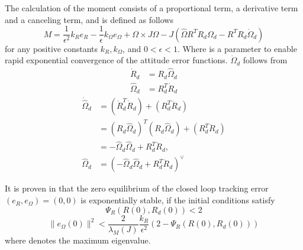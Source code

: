 
The calculation of the moment consists of a proportional term, a derivative term and a canceling term, and is defined as follows
\begin{equation}\label{eq:con.M}
M = \frac{1}{\epsilon^2}k_Re_R-\frac{1}{\epsilon}k_\Omega e_\Omega+\Omega\times J\Omega-J(\hat{\Omega}R^TR_d\Omega_d-R^TR_d\dot{\Omega}_d)
\end{equation}
for any positive constants $ k_R, k_\Omega $, and $ 0<\epsilon<1 $. Where  is a parameter to enable rapid exponential convergence of the attitude error functions. $ \dot{\Omega}_d $ follows from 
\begin{equation}\label{key}
\begin{aligned}
\dot{R}_d&=R_d\hat{\Omega}_d\\
\hat{\Omega}_d&=R_d^T\dot{R}_d
\end{aligned}
\end{equation}
\begin{equation}\label{key}
\begin{aligned}
\dot{\hat{\Omega}}_d&=(\dot{R}_d^T\dot{R}_d)+(R_d^T\ddot{R}_d)\\
&=(R_d\hat{\Omega}_d)^T(R_d\hat{\Omega}_d)+(R_d^T\ddot{R}_d)\\
&=-\hat{\Omega}_d\hat{\Omega}_d+R_d^T\ddot{R}_d,\\
\hat{\Omega}_d&=(-\hat{\Omega}_d\hat{\Omega}_d+R_d^T\ddot{R}_d)^\vee
\end{aligned}
\end{equation}

It is proven in \cite{Lee2010} that the zero equilibrium of the closed loop tracking error $ (e_R,e_\Omega)=(0,0) $ is exponentially stable, if the initial conditions satisfy
\begin{equation}\label{eq:dom1}
\Psi_R(R(0),R_d(0))<2
\end{equation}
\begin{equation}\label{eq:dom2}
\parallel e_\Omega(0)\parallel^2<\frac{2}{\lambda_M(J)}\frac{k_R}{\epsilon^2}(2-\Psi_R(R(0),R_d(0)))
\end{equation}
where  denotes the maximum eigenvalue.

